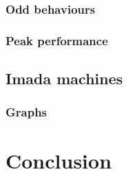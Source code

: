 \documentclass[a4paper,11pt,oneside]{book}
\begin{document}
\subsection{Odd behaviours}

\subsection{Peak performance}


\section{Imada machines}
\subsection{Graphs}

\chapter{Conclusion}


\end{document}
